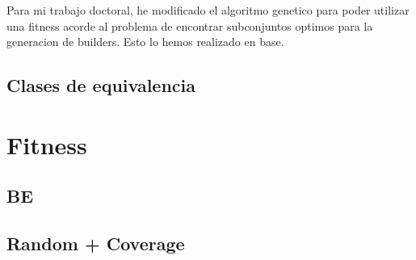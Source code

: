 Para mi trabajo doctoral, he modificado el algoritmo genetico para poder utilizar una fitness acorde al problema de encontrar subconjuntos optimos para la generacion de builders.
Esto lo hemos realizado en base.

\subsection{Clases de equivalencia}

\section{Fitness}
\subsection{BE}

\subsection{Random + Coverage}

